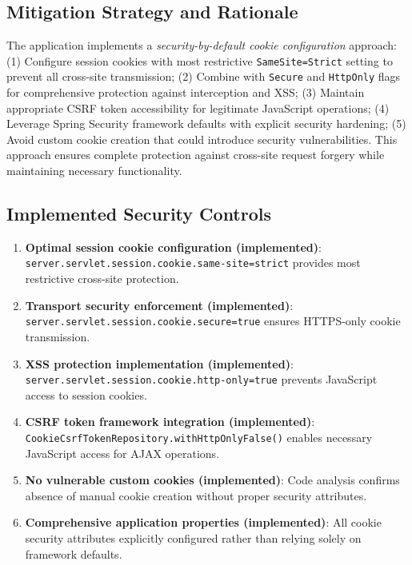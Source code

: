 \documentclass[]{UCD_CS_FYP_Report}
\begin{document}
\subsection{Mitigation Strategy and Rationale}
The application implements a \textit{security-by-default cookie configuration} approach: (1) Configure session cookies with most restrictive \texttt{SameSite=Strict} setting to prevent all cross-site transmission; (2) Combine with \texttt{Secure} and \texttt{HttpOnly} flags for comprehensive protection against interception and XSS; (3) Maintain appropriate CSRF token accessibility for legitimate JavaScript operations; (4) Leverage Spring Security framework defaults with explicit security hardening; (5) Avoid custom cookie creation that could introduce security vulnerabilities. This approach ensures complete protection against cross-site request forgery while maintaining necessary functionality.

\subsection{Implemented Security Controls}
\begin{enumerate}
	\item \textbf{Optimal session cookie configuration (implemented)}: \texttt{server.servlet.session.cookie.same-site=strict} provides most restrictive cross-site protection.
	\item \textbf{Transport security enforcement (implemented)}: \texttt{server.servlet.session.cookie.secure=true} ensures HTTPS-only cookie transmission.
	\item \textbf{XSS protection implementation (implemented)}: \texttt{server.servlet.session.cookie.http-only=true} prevents JavaScript access to session cookies.
	\item \textbf{CSRF token framework integration (implemented)}: \texttt{CookieCsrfTokenRepository.withHttpOnlyFalse()} enables necessary JavaScript access for AJAX operations.
	\item \textbf{No vulnerable custom cookies (implemented)}: Code analysis confirms absence of manual cookie creation without proper security attributes.
	\item \textbf{Comprehensive application properties (implemented)}: All cookie security attributes explicitly configured rather than relying solely on framework defaults.
\end{enumerate}
\end{document}
